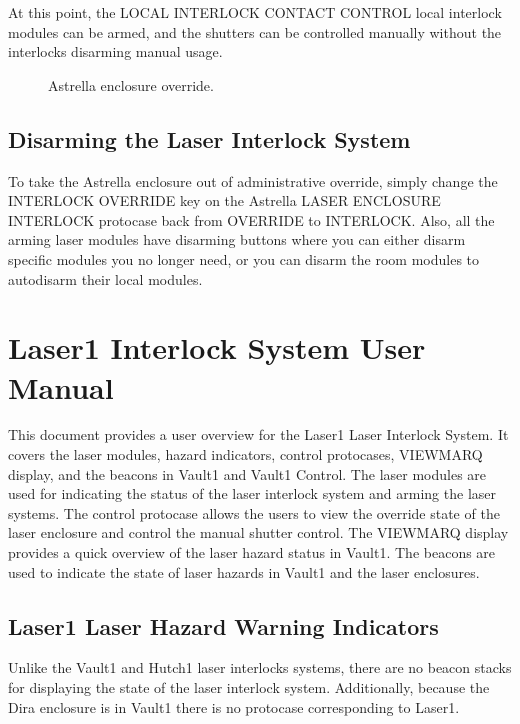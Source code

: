 \documentclass[letterpaper,10pt,english]{sphinxmanual}
\begin{document}
\sphinxAtStartPar
At this point, the LOCAL INTERLOCK CONTACT CONTROL local interlock modules can be armed, and the shutters can be controlled manually without the interlocks disarming manual usage.

\begin{figure}[htbp]
\centering
\capstart

\noindent{}
\caption{ Astrella enclosure override.}\label{\detokenize{user_documentation/Hutch-1_laser:id10}}\end{figure}


\subsection{Disarming the Laser Interlock System}
\label{\detokenize{user_documentation/Hutch-1_laser:disarming-the-laser-interlock-system}}
\sphinxAtStartPar
To take the Astrella enclosure out of administrative override, simply change the INTERLOCK OVERRIDE key on the Astrella LASER ENCLOSURE INTERLOCK protocase back from OVERRIDE to INTERLOCK.
Also, all the arming laser modules have disarming buttons where you can either disarm specific modules you no longer need, or you can disarm the room modules to auto\sphinxhyphen{}disarm their local modules.

\sphinxstepscope


\section{Laser\sphinxhyphen{}1 Interlock System User Manual}
\label{\detokenize{user_documentation/Laser-1:laser-1-interlock-system-user-manual}}\label{\detokenize{user_documentation/Laser-1::doc}}
\sphinxAtStartPar
This document provides a user overview for the Laser\sphinxhyphen{}1 Laser Interlock System.
It covers the laser modules, hazard indicators, control protocases, VIEWMARQ display, and the beacons in Vault\sphinxhyphen{}1 and Vault\sphinxhyphen{}1 Control.
The laser modules are used for indicating the status of the laser interlock system and arming the laser systems.
The control protocase allows the users to view the override state of the laser enclosure and control the manual shutter control.
The VIEWMARQ display provides a quick overview of the laser hazard status in Vault\sphinxhyphen{}1.
The beacons are used to indicate the state of laser hazards in Vault\sphinxhyphen{}1 and the laser enclosures.


\subsection{Laser\sphinxhyphen{}1 Laser Hazard Warning Indicators}
\label{\detokenize{user_documentation/Laser-1:laser-1-laser-hazard-warning-indicators}}
\sphinxAtStartPar
Unlike the Vault\sphinxhyphen{}1 and Hutch\sphinxhyphen{}1 laser interlocks systems, there are no beacon stacks for displaying the state of the laser interlock system.
Additionally, because the Dira enclosure is in Vault\sphinxhyphen{}1 there is no protocase corresponding to Laser\sphinxhyphen{}1.
\end{document}
